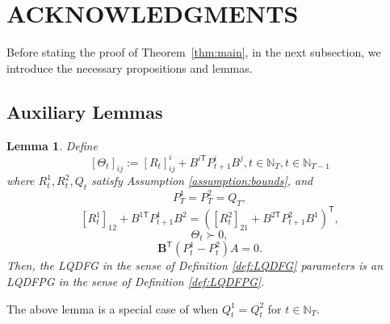 \documentclass[letterpaper, 10 pt, conference]{ieeeconf}  %
\newcommand{\transpose}{\mathsf{T}}
\newtheorem{lemma}{Lemma}
\begin{document}
\section{ACKNOWLEDGMENTS}






\appendix
Before stating the proof of Theorem~\ref{thm:main}, in the next subsection, we introduce the necessary propositions and lemmas. 
\subsection{Auxiliary Lemmas}
\begin{lemma}
    Define
        \begin{equation}\label{eq:Theta}
        [\Theta_{t}]_{ij} := [R_{t}]^{i}_{ij} + B^{i\transpose}P_{t+1}^{i}B^{j},t\in \mathbb{N}_{T},t\in\mathbb{N}_{T-1}
        \end{equation}
    where $R_{t}^{1},R_{t}^{2},Q_{t}$ satisfy Assumption \ref{assumption:bounds}, and
    \begin{equation*}
        P_{T}^{1} = P_{T}^{2}=Q_{T},
    \end{equation*}
        \begin{equation}\label{eq:costFPDG1}
            [R_{t}^{1}]_{12} + B^{1\transpose}P_{t+1}^{1}B^{2} = ([R_{t}^{2}]_{21} + B^{2\transpose}P_{t+1}^{2}B^{1})^{\transpose},
        \end{equation}
        \begin{equation}\label{eq:costFPDG2}
            \Theta_{t} \succ 0,
        \end{equation}
        \begin{equation}\label{eq:costFPDG3}
            \mathbf{B}^{\transpose}(P_{t}^{1}-P_{t}^{2})A=0.
        \end{equation}
    Then, the LQDFG in the sense of Definition \ref{def:LQDFG} parameters is an LQDFPG in the sense of Definition \ref{def:LQDFPG}.
\end{lemma}
The above lemma is a special case of \cite[Theorem 6]{prasad_structure_2023} when $Q_{t}^{1}=Q_{t}^{2}$ for $t\in \mathbb{N}_T$.
\end{document}
